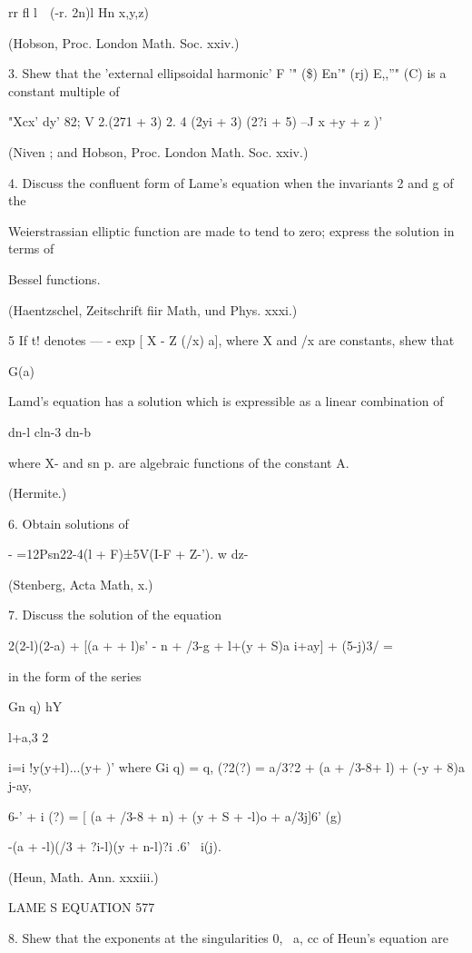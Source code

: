 {{{{{{{{rr fl l\ \ (-r. 2n)l Hn x,y,z)

(Hobson, Proc. London Math. Soc. xxiv.)

3. Shew that the 'external ellipsoidal harmonic' F '" (\$) En'" (rj)
E,,''" (C) is a constant multiple of



"Xcx' dy' 82; V 2.(271 + 3) 2. 4 (2yi + 3) (2?i + 5) --J x +y + z )'

(Niven ; and Hobson, Proc. London Math. Soc. xxiv.)

4. Discuss the confluent form of Lame's equation when the invariants 2
and g of the

Weierstrassian elliptic function are made to tend to zero; express the
solution in terms of

Bessel functions.

(Haentzschel, Zeitschrift fiir Math, und Phys. xxxi.)

5 If t! denotes — - exp [ X - Z (/x) a], where X and /x are constants,
shew that

G(a)

Lamd's equation has a solution which is expressible as a linear
combination of

dn-l cln-3 dn-b

where X- and sn p. are algebraic functions of the constant A.

(Hermite.)

6. Obtain solutions of

- =12Psn22-4(l + F)±5V(I-F + Z-'). w dz-

(Stenberg, Acta Math, x.)

7. Discuss the solution of the equation

2(2-l)(2-a) + [(a + + l)s' - n + /3-g + l+(y + S)a i+ay] + (5-j)3/ =

in the form of the series

Gn q) hY



l+a,3 2



i=i !y(y+l)...(y+ )' where Gi q) = q, (?2(?) = a/3?2 + (a + /3-8+ l) +
(-y + 8)a j-ay,

6-' + i (?) = [ (a + /3-8 + n) + (y + S + -l)o + a/3j]6' (g)

-(a + -l)(/3 + ?i-l)(y + n-l)?i .6' \ i(j).

(Heun, Math. Ann. xxxiii.)



LAME S EQUATION 577

8. Shew that the exponents at the singularities 0, \, a, cc of Heun's
equation are

}}}}}}}}
